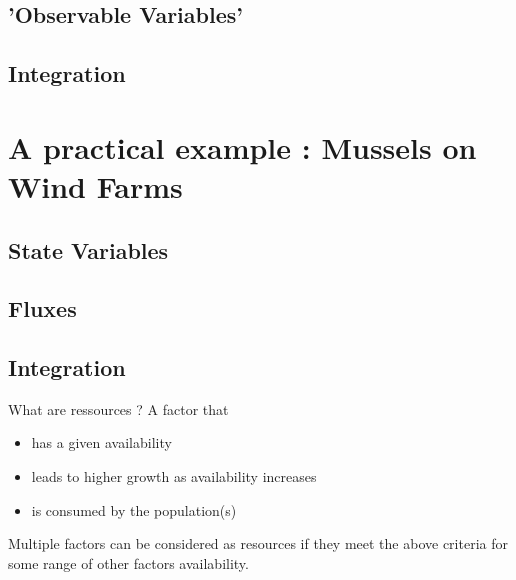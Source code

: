 \documentclass[final,xcolor=dvipsnames]{beamer}
\begin{document}
\subsection{'Observable Variables'}
\subsection{Integration}



\section{A practical example : Mussels on Wind Farms}
\subsection{State Variables}

\subsection{Fluxes}

\subsection{Integration}


\begin{frame}{What are ressources ?}
 A factor that
 \begin{itemize}
 \item has a given availability
 \item leads to higher growth as availability increases
 \item is consumed by the population(s)
 \end{itemize}
 Multiple factors can be considered as resources if they meet the above criteria for some range of other factors availability.
\end{frame}
\end{document}
